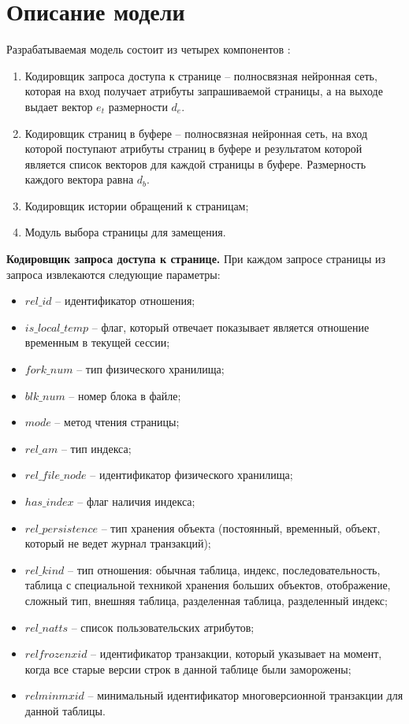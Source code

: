 \section{Описание модели}
Разрабатываемая модель состоит из четырех компонентов \cite{deepBM}:
\begin{enumerate}
	\item Кодировщик запроса доступа к странице -- полносвязная нейронная сеть, которая на вход получает атрибуты запрашиваемой страницы, а на выходе выдает вектор $e_t$ размерности $d_e$.
	\item Кодировщик страниц в буфере -- полносвязная нейронная сеть, на вход которой поступают атрибуты страниц в буфере и результатом которой является список векторов для каждой страницы в буфере. Размерность каждого вектора равна $d_b$.
	\item Кодировщик истории обращений к страницам;
	\item Модуль выбора страницы для замещения. 
\end{enumerate}

\textbf{Кодировщик запроса доступа к странице.}
При каждом запросе страницы из запроса извлекаются следующие параметры:
\begin{itemize}
	\item $rel\_id$ -- идентификатор отношения;
	\item $is\_local\_temp$ -- флаг, который отвечает показывает является отношение временным в текущей сессии;
	\item $fork\_num$ -- тип физического хранилища;
	\item $blk\_num$ -- номер блока в файле;
	\item $mode$ -- метод чтения страницы;
	\item $rel\_am$ -- тип индекса;
	\item $rel\_file\_node$ -- идентификатор физического хранилища;
	\item $has\_index$ -- флаг наличия индекса;
	\item $rel\_persistence$ -- тип хранения объекта (постоянный, временный, объект, который не ведет журнал транзакций);
	\item $rel\_kind$ -- тип отношения: обычная таблица, индекс, последовательность, таблица с специальной техникой хранения больших объектов, отображение, сложный тип, внешняя таблица, разделенная таблица, разделенный индекс;
	\item $rel\_natts$ -- список пользовательских атрибутов;
	\item $relfrozenxid$ -- идентификатор транзакции, который указывает на момент, когда все старые версии строк в данной таблице были заморожены;
	\item $relminmxid$ -- минимальный идентификатор многоверсионной транзакции для данной таблицы.
\end{itemize}

